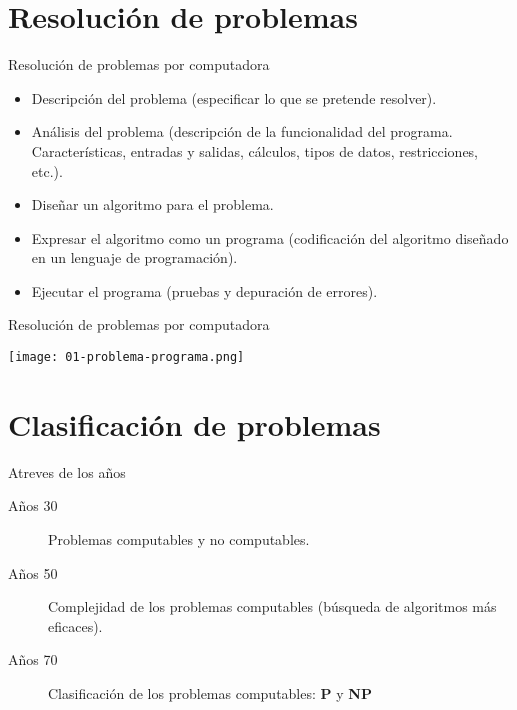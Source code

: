 \section{Resolución de problemas}

\begin{frame}[c]{Resolución de problemas por computadora}
  \begin{itemize}
    \item Descripción del problema (especificar lo que se pretende resolver).
    \item Análisis del problema (descripción de la funcionalidad del programa.
      Características, entradas y salidas, cálculos, tipos de datos,
      restricciones, etc.).
    \item Diseñar un algoritmo para el problema.
    \item Expresar el algoritmo como un programa (codificación del algoritmo
      diseñado en un lenguaje de programación).
    \item Ejecutar el programa (pruebas y depuración de errores).
  \end{itemize}
\end{frame}

\begin{frame}[c]{Resolución de problemas por computadora}
  \begin{center}
    \texttt{[image: 01-problema-programa.png]}
  \end{center}
\end{frame}

\section{Clasificación de problemas}

\begin{frame}[c]{Atreves de los años}
  \begin{description}
    \item[Años 30] Problemas computables y no computables.
      \vspace{\baselineskip}
    \item[Años 50] Complejidad de los problemas computables (búsqueda de
      algoritmos más eficaces).
      \vspace{\baselineskip}
    \item[Años 70] Clasificación de los problemas computables: \textbf{P}
      y \textbf{NP}
  \end{description}
\end{frame}

